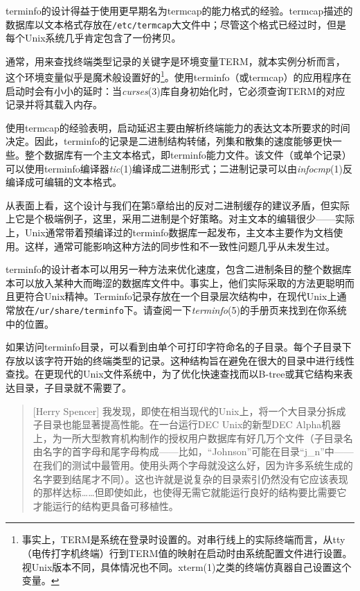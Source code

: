 \documentclass[12pt,oneside]{book}
\begin{document}
\begin{common-format}
terminfo的设计得益于使用更早期名为termcap的能力格式的经验。termcap描述的数据库以文本格式存放在\verb+/etc/termcap+大文件中；尽管这个格式已经过时，但是每个Unix系统几乎肯定包含了一份拷贝。

通常，用来查找终端类型记录的关键字是环境变量TERM，就本实例分析而言，这个环境变量似乎是魔术般设置好的\footnote{事实上，TERM是系统在登录时设置的。对串行线上的实际终端而言，从tty（电传打字机终端）行到TERM值的映射在启动时由系统配置文件进行设置。视Unix版本不同，具体情况也不同。xterm(1)之类的终端仿真器自己设置这个变量。}。使用terminfo（或termcap）的应用程序在启动时会有小小的延时：当\textit{curses}(3)库自身初始化时，它必须查询TERM的对应记录并将其载入内存。

使用termcap的经验表明，启动延迟主要由解析终端能力的表达文本所要求的时间决定。因此，terminfo的记录是二进制结构转储，列集和散集的速度能够更快一些。整个数据库有一个主文本格式，即terminfo能力文件。该文件（或单个记录）可以使用terminfo编译器\textit{tic}(1)编译成二进制形式；二进制记录可以由\textit{infocmp}(1)反编译成可编辑的文本格式。

从表面上看，这个设计与我们在第5章给出的反对二进制缓存的建议矛盾，但实际上它是个极端例子，这里，采用二进制是个好策略。对主文本的编辑很少——实际上，Unix通常带着预编译过的terminfo数据库一起发布，主文本主要作为文档使用。这样，通常可能影响这种方法的同步性和不一致性问题几乎从未发生过。

terminfo的设计者本可以用另一种方法来优化速度，包含二进制条目的整个数据库本可以放入某种大而晦涩的数据库文件中。事实上，他们实际采取的方法更聪明而且更符合Unix精神。Terminfo记录存放在一个目录层次结构中，在现代Unix上通常放在\verb+/ur/share/terminfo+下。请查阅一下\textit{terminfo}(5)的手册页来找到在你系统中的位置。

如果访问terminfo目录，可以看到由单个可打印字符命名的子目录。每个子目录下存放以该字符开始的终端类型的记录。这种结构旨在避免在很大的目录中进行线性查找。在更现代的Unix文件系统中，为了优化快速查找而以B-tree或萁它结构来表达目录，子目录就不需要了。

\begin{quote}[Herry Spencer]
我发现，即使在相当现代的Unix上，将一个大目录分拆成子目录也能显著提高性能。在一台运行DEC Unix的新型DEC Alpha机器上，为一所大型教育机构制作的授权用户数据库有好几万个文件（子目录名由名字的首字母和尾字母构成——比如，“Johnson”可能在目录“j\_{}n”中——在我们的测试中最管用。使用头两个字母就没这么好，因为许多系统生成的名字要到结尾才不同）。这也许就是说复杂的目录索引仍然没有它应该表现的那样达标……但即使如此，也使得无需它就能运行良好的结构要比需要它才能运行的结构更具备可移植性。
\end{quote}


\end{common-format}
\end{document}
